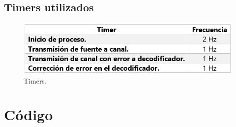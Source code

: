 \documentclass[12pt,letterpaper]{article}
\begin{document}
\subsection{Timers utilizados}
\begin{figure}[ht]
    \centering
    \includegraphics[width=.6\textwidth]{reloj.png}
    \caption{Timers.}
\end{figure}

\newpage
\section{Código}
\end{document}
